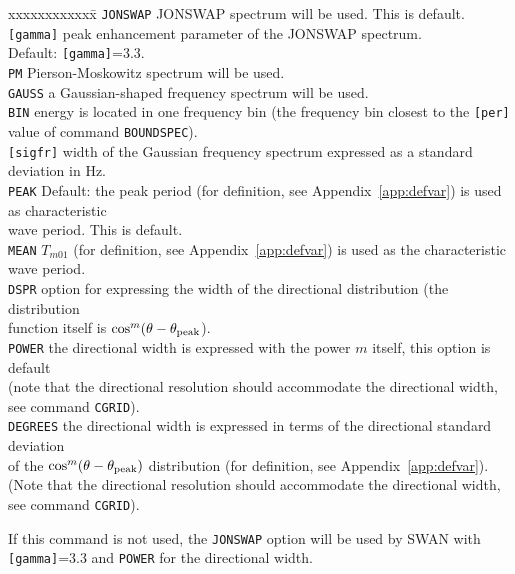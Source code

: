 \documentclass[12pt]{book}
\begin{document}
\begin{tabbing}
xxxxxxxxxxxx\= \kill
{\tt JONSWAP}  \> JONSWAP spectrum will be used. This is default.\\
{\tt [gamma]}  \> peak enhancement parameter of the JONSWAP spectrum.\+\\
                  Default: {\tt [gamma]}=3.3.\-\\
{\tt PM}       \> Pierson-Moskowitz spectrum will be used.\\
{\tt GAUSS}    \> a Gaussian-shaped frequency spectrum will be used.\\
{\tt BIN}      \> energy is located in one frequency bin (the frequency bin closest to the {\tt [per]}\+\\
                  value of command {\tt BOUNDSPEC}).\-\\
{\tt [sigfr]}  \> width of the Gaussian frequency spectrum expressed as a standard deviation in Hz.\\
{\tt PEAK}     \> Default: the peak period (for definition, see Appendix~\ref{app:defvar}) is used as characteristic\+\\
                  wave period. This is default.\-\\
{\tt MEAN}     \> $T_{m01}$ (for definition, see Appendix~\ref{app:defvar}) is used as the characteristic wave period.\\
{\tt DSPR}     \> option for expressing the width of the directional distribution (the distribution\+\\
                  function itself is $\cos^m(\theta-\theta_{\rm peak}$).\-\\
{\tt POWER}    \> the directional width is expressed with the power $m$ itself, this option is default\+\\
                  (note that the directional resolution should accommodate the directional width,\\
                  see command {\tt CGRID}).\-\\
{\tt DEGREES}  \> the directional width is expressed in terms of the directional standard deviation\+\\
                  of the $\cos^m(\theta-\theta_{\rm peak})$ distribution (for definition, see Appendix~\ref{app:defvar}).\\
                  (Note that the directional resolution should accommodate the directional width,\\
                  see command {\tt CGRID}).\-\\
\end{tabbing}
If this command is not used, the {\tt JONSWAP} option will be used by SWAN with {\tt [gamma]}=3.3 and {\tt POWER} for the directional width.
\end{document}
